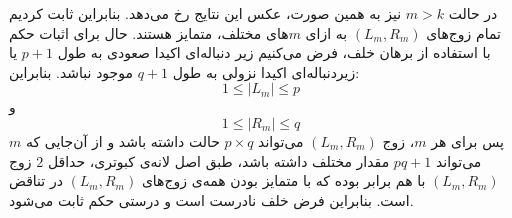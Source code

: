 \p
 در حالت 
    $m > k$
                نیز  به همین صورت، عکس این نتایج رخ می‌دهد. بنابراین ثابت کردیم تمام زوج‌های
    $(L_{m}, R_{m})$
    به ازای $m$های مختلف، متمایز هستند. 
    \p
    حال برای اثبات حکم با استفاده از برهان خلف، فرض می‌کنیم زیر دنباله‌ای اکیدا صعودی به طول 
    $p+1$
      یا زیردنباله‌ای اکیدا نزولی به طول 
    $q+1$
      موجود نباشد. بنابراین: 
    $$1\leq |L_{m}|\leq p$$
      و 
    $$1\leq |R_{m}|\leq q$$
    پس برای هر $m$، زوج 
    $(L_{m}, R_{m})$
      می‌تواند 
    $p \times q$
    حالت داشته باشد و از آن‌جایی که $m$ می‌تواند 
    $pq + 1$
      مقدار مختلف داشته باشد، طبق اصل لانه‌ی کبوتری، حداقل 
      $2$
       زوج 
    $(L_{m}, R_{m})$
      با هم برابر بوده که با متمایز بودن همه‌ی زوج‌های 
    $(L_{m}, R_{m})$
      در تناقض است. بنابراین فرض خلف نادرست است و درستی حکم ثابت می‌شود. 